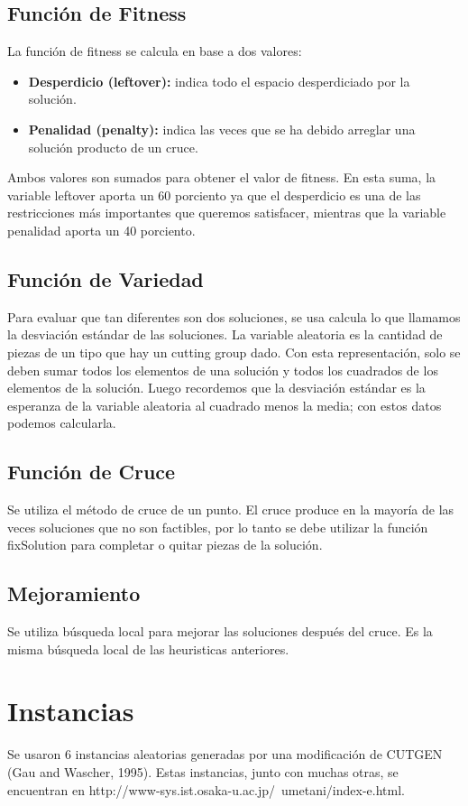\documentclass[letter,10pt]{article}
\begin{document}
\subsection{Función de Fitness}
La función de fitness se calcula en base a dos valores:
\begin{itemize}
 \item \textbf{Desperdicio (leftover):} indica todo el espacio desperdiciado por la solución. 
  \item \textbf{Penalidad (penalty):} indica las veces que se ha debido arreglar una solución producto de un cruce.
\end{itemize}

Ambos valores son sumados para obtener el valor de fitness. En esta suma, la variable leftover aporta un 60 porciento ya que 
el desperdicio es una de las restricciones más importantes que queremos satisfacer, mientras que la variable penalidad aporta 
un 40 porciento.

\subsection{Función de Variedad}
Para evaluar que tan diferentes son dos soluciones, se usa calcula lo que llamamos la desviaci\'on est\'andar de las soluciones.
La variable aleatoria es la cantidad de piezas de un tipo que hay un cutting group dado. Con esta representaci\'on, solo se deben
sumar todos los elementos de una soluci\'on y todos los cuadrados de los elementos de la soluci\'on. Luego recordemos que la
desviaci\'on est\'andar es la esperanza de la variable aleatoria al cuadrado menos la media; con estos datos podemos calcularla.

\subsection{Función de Cruce}
Se utiliza el método de cruce de un punto. El cruce produce en la mayoría de las veces soluciones que no son factibles, por 
lo tanto se debe utilizar la función fixSolution para completar o quitar piezas de la solución.

\subsection{Mejoramiento}
Se utiliza b\'usqueda local para mejorar las soluciones despu\'es del cruce. Es la misma b\'usqueda local de las heuristicas
anteriores.

\section{Instancias}
Se usaron 6 instancias aleatorias generadas por una modificaci\'on de CUTGEN (Gau and Wascher, 1995).
Estas instancias, junto con muchas otras, se encuentran en http://www-sys.ist.osaka-u.ac.jp/~umetani/index-e.html.
\end{document}
